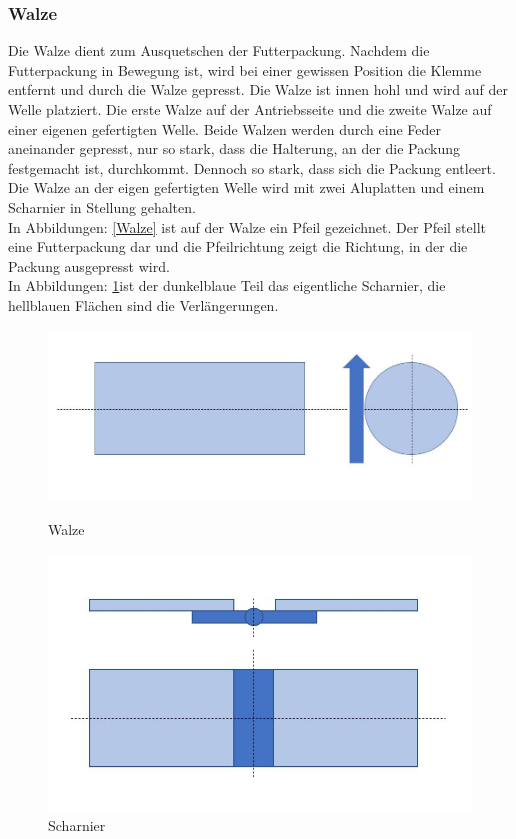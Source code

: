 \subsubsection{Walze}

Die Walze dient zum Ausquetschen der Futterpackung. Nachdem die Futterpackung in Bewegung ist, wird bei einer gewissen Position die Klemme entfernt und durch die Walze gepresst. Die Walze ist innen hohl und wird auf der Welle platziert. Die erste Walze auf der Antriebsseite und die zweite Walze auf einer eigenen gefertigten Welle. Beide Walzen werden durch eine Feder aneinander gepresst, nur so stark, dass die Halterung, an der die Packung festgemacht ist, durchkommt. Dennoch so stark, dass sich die Packung entleert. Die Walze an der eigen gefertigten Welle wird mit zwei Aluplatten und einem Scharnier in Stellung gehalten.\\ 
In Abbildungen: \ref{Walze} ist auf der Walze ein Pfeil gezeichnet. Der Pfeil stellt eine Futterpackung dar und die Pfeilrichtung zeigt die Richtung, in der die Packung ausgepresst wird.  \\
In Abbildungen: \ref{Scharnier}ist der dunkelblaue Teil das eigentliche Scharnier, die hellblauen Flächen sind die Verlängerungen. 

\begin{figure}[H]
   \begin{minipage}[hbt]{.4\linewidth} %
      \includegraphics[width=\linewidth]{Bilder/Powerpoint/Walze}
      \caption{Walze}
      \label{Walze}
   \end{minipage}
   \hspace{.2\linewidth}%
   \begin{minipage}[hbt]{.4\linewidth} %
      \includegraphics[width=\linewidth]{Bilder/Powerpoint/Schanier}
      \caption{Scharnier}
	  \label{Scharnier}      
      \end{minipage}
\end{figure}
\newpage
